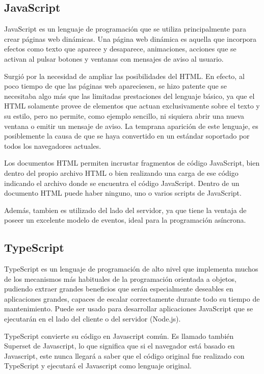 \documentclass[a4paper, 12pt]{book}
\begin{document}
\subsection{JavaScript}
\label{subsec:estilo}

JavaScript\cite{JavaScript} es un lenguaje de programaci\'on que se utiliza principalmente para crear p\'aginas
web din\'amicas. Una p\'agina web din\'amica es aquella que incorpora efectos como texto que
aparece y desaparece, animaciones, acciones que se activan al pulsar botones y ventanas con
mensajes de aviso al usuario.

Surgi\'o por la necesidad de ampliar las posibilidades del HTML. En efecto, al poco tiempo
de que las p\'aginas web apareciesen, se hizo patente que se necesitaba algo m\'as que las limitadas
prestaciones del lenguaje b\'asico, ya que el HTML solamente provee de elementos que actuan
exclusivamente sobre el texto y su estilo, pero no permite, como ejemplo sencillo, ni siquiera
abrir una nueva ventana o emitir un mensaje de aviso. La temprana aparici\'on de este lenguaje,
es posiblemente la causa de que se haya convertido en un est\'andar soportado por todos los
navegadores actuales.

Los documentos HTML permiten incrustar fragmentos de c\'odigo JavaScript, bien dentro
del propio archivo HTML o bien realizando una carga de ese c\'odigo indicando el archivo donde
se encuentra el c\'odigo JavaScript. Dentro de un documento HTML puede haber ninguno, uno o
varios scripts de JavaScript.

Adem\'as, tambien es utilizado del lado del servidor, ya que tiene la ventaja de poseer un
excelente modelo de eventos, ideal para la programaci\'on as\'incrona.


\subsection{TypeScript}
\label{subsec:typescript}

TypeScript\cite{TypeScript} es un lenguaje de programaci\'on de alto nivel que implementa muchos de los
mecanismos m\'as habituales de la programaci\'on orientada a objetos, pudiendo extraer grandes
beneficios que ser\'an especialmente deseables en aplicaciones grandes, capaces de escalar correctamente
durante todo su tiempo de mantenimiento. Puede ser usado para desarrollar aplicaciones
JavaScript que se ejecutar\'an en el lado del cliente o del servidor (Node.js).

TypeScript convierte su c\'odigo en Javascript com\'un. Es llamado tambi\'en Superset de Javascript,
lo que significa que si el navegador est\'a basado en Javascript, este nunca llegar\'a a saber que el
c\'odigo original fue realizado con TypeScript y ejecutar\'a el Javascript como lenguaje original.
\end{document}
